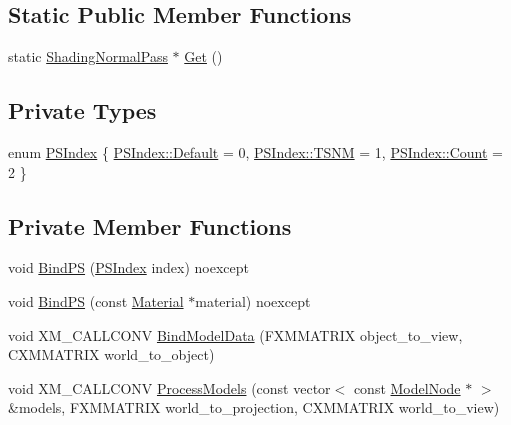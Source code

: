 \subsection*{Static Public Member Functions}
\begin{DoxyCompactItemize}
\item 
static \hyperlink{classmage_1_1_shading_normal_pass}{Shading\+Normal\+Pass} $\ast$ \hyperlink{classmage_1_1_shading_normal_pass_a27351f21b0e5d780b9c68e01f1428ace}{Get} ()
\end{DoxyCompactItemize}
\subsection*{Private Types}
\begin{DoxyCompactItemize}
\item 
enum \hyperlink{classmage_1_1_shading_normal_pass_a6d277753d26a7854c448b3e0d9275b19}{P\+S\+Index} \{ \hyperlink{classmage_1_1_shading_normal_pass_a6d277753d26a7854c448b3e0d9275b19a7a1920d61156abc05a60135aefe8bc67}{P\+S\+Index\+::\+Default} = 0, 
\hyperlink{classmage_1_1_shading_normal_pass_a6d277753d26a7854c448b3e0d9275b19a6e02c9f63944ea221e7d55c11ecae07b}{P\+S\+Index\+::\+T\+S\+NM} = 1, 
\hyperlink{classmage_1_1_shading_normal_pass_a6d277753d26a7854c448b3e0d9275b19ae93f994f01c537c4e2f7d8528c3eb5e9}{P\+S\+Index\+::\+Count} = 2
 \}
\end{DoxyCompactItemize}
\subsection*{Private Member Functions}
\begin{DoxyCompactItemize}
\item 
void \hyperlink{classmage_1_1_shading_normal_pass_ab691c2125f9e21c7e70f2737037504bc}{Bind\+PS} (\hyperlink{classmage_1_1_shading_normal_pass_a6d277753d26a7854c448b3e0d9275b19}{P\+S\+Index} index) noexcept
\item 
void \hyperlink{classmage_1_1_shading_normal_pass_af8ef8987bda86646712780b5cfad0b72}{Bind\+PS} (const \hyperlink{structmage_1_1_material}{Material} $\ast$material) noexcept
\item 
void X\+M\+\_\+\+C\+A\+L\+L\+C\+O\+NV \hyperlink{classmage_1_1_shading_normal_pass_adbaa57a7ff6bc885bf2ab890b0f933d4}{Bind\+Model\+Data} (F\+X\+M\+M\+A\+T\+R\+IX object\+\_\+to\+\_\+view, C\+X\+M\+M\+A\+T\+R\+IX world\+\_\+to\+\_\+object)
\item 
void X\+M\+\_\+\+C\+A\+L\+L\+C\+O\+NV \hyperlink{classmage_1_1_shading_normal_pass_a383e9cab46d4d9bdfcf320c68a210d0d}{Process\+Models} (const vector$<$ const \hyperlink{classmage_1_1_model_node}{Model\+Node} $\ast$ $>$ \&models, F\+X\+M\+M\+A\+T\+R\+IX world\+\_\+to\+\_\+projection, C\+X\+M\+M\+A\+T\+R\+IX world\+\_\+to\+\_\+view)
\end{DoxyCompactItemize}
